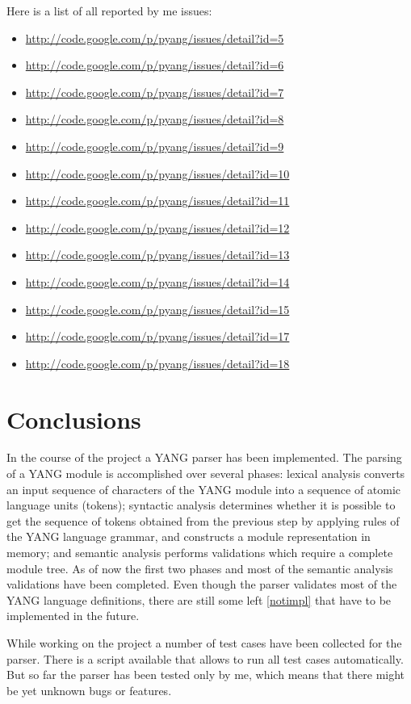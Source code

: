 \documentclass[conference]{IEEEtran}
\begin{document}
Here is a list of all reported by me issues:
\begin{itemize}
\item \url{http://code.google.com/p/pyang/issues/detail?id=5}
\item \url{http://code.google.com/p/pyang/issues/detail?id=6}
\item \url{http://code.google.com/p/pyang/issues/detail?id=7}
\item \url{http://code.google.com/p/pyang/issues/detail?id=8}
\item \url{http://code.google.com/p/pyang/issues/detail?id=9}
\item \url{http://code.google.com/p/pyang/issues/detail?id=10}
\item \url{http://code.google.com/p/pyang/issues/detail?id=11}
\item \url{http://code.google.com/p/pyang/issues/detail?id=12}
\item \url{http://code.google.com/p/pyang/issues/detail?id=13}
\item \url{http://code.google.com/p/pyang/issues/detail?id=14}
\item \url{http://code.google.com/p/pyang/issues/detail?id=15}
\item \url{http://code.google.com/p/pyang/issues/detail?id=17}
\item \url{http://code.google.com/p/pyang/issues/detail?id=18}
\end{itemize}

\section{Conclusions}
In the course of the project a YANG parser has been implemented.
The parsing of a YANG module is accomplished over several phases: 
lexical analysis converts an input sequence of characters of the YANG module into a sequence of atomic language units (tokens);
syntactic analysis determines whether it is possible to get the sequence of tokens obtained from the previous step by applying 
rules of the YANG language grammar, and constructs a module representation in memory; and semantic analysis performs 
validations which require a complete module tree. As of now the first two phases and most of the semantic analysis validations 
have been completed. Even though the parser validates most of the YANG language definitions,
there are still some left \ref{notimpl} that have to be implemented in the future.   

While working on the project a number of test cases have been collected for the parser. There is a script available that allows
to run all test cases automatically. But so far the parser has been tested only by me, which means that there might be yet unknown bugs or features.
\end{document}
